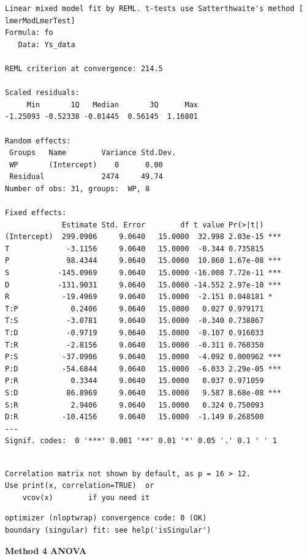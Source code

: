 \documentclass[
  letterpaper,
  DIV=11,
  numbers=noendperiod]{scrartcl}
\begin{document}
\begin{verbatim}
Linear mixed model fit by REML. t-tests use Satterthwaite's method [
lmerModLmerTest]
Formula: fo
   Data: Ys_data

REML criterion at convergence: 214.5

Scaled residuals: 
     Min       1Q   Median       3Q      Max 
-1.25093 -0.52338 -0.01445  0.56145  1.16801 

Random effects:
 Groups   Name        Variance Std.Dev.
 WP       (Intercept)    0      0.00   
 Residual             2474     49.74   
Number of obs: 31, groups:  WP, 8

Fixed effects:
             Estimate Std. Error        df t value Pr(>|t|)    
(Intercept)  299.0906     9.0640   15.0000  32.998 2.03e-15 ***
T             -3.1156     9.0640   15.0000  -0.344 0.735815    
P             98.4344     9.0640   15.0000  10.860 1.67e-08 ***
S           -145.0969     9.0640   15.0000 -16.008 7.72e-11 ***
D           -131.9031     9.0640   15.0000 -14.552 2.97e-10 ***
R            -19.4969     9.0640   15.0000  -2.151 0.048181 *  
T:P            0.2406     9.0640   15.0000   0.027 0.979171    
T:S           -3.0781     9.0640   15.0000  -0.340 0.738867    
T:D           -0.9719     9.0640   15.0000  -0.107 0.916033    
T:R           -2.8156     9.0640   15.0000  -0.311 0.760350    
P:S          -37.0906     9.0640   15.0000  -4.092 0.000962 ***
P:D          -54.6844     9.0640   15.0000  -6.033 2.29e-05 ***
P:R            0.3344     9.0640   15.0000   0.037 0.971059    
S:D           86.8969     9.0640   15.0000   9.587 8.68e-08 ***
S:R            2.9406     9.0640   15.0000   0.324 0.750093    
D:R          -10.4156     9.0640   15.0000  -1.149 0.268500    
---
Signif. codes:  0 '***' 0.001 '**' 0.01 '*' 0.05 '.' 0.1 ' ' 1
\end{verbatim}

\begin{verbatim}

Correlation matrix not shown by default, as p = 16 > 12.
Use print(x, correlation=TRUE)  or
    vcov(x)        if you need it
\end{verbatim}

\begin{verbatim}
optimizer (nloptwrap) convergence code: 0 (OK)
boundary (singular) fit: see help('isSingular')
\end{verbatim}

\textbf{Method 4 ANOVA}
\end{document}
